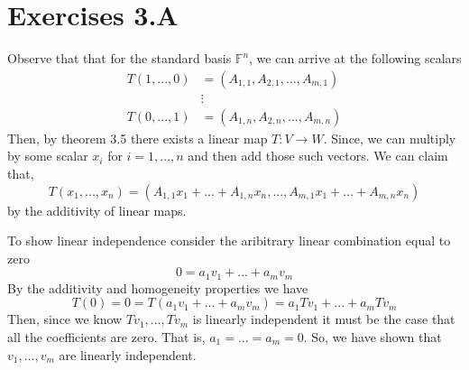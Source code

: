 \documentclass[10pt, twocolumn]{article}
\newcommand{\F}{\mathbb{F}}
\begin{document}
\section{Exercises 3.A}
\begin{q}[3]
	Observe that that for the standard basis $ \F^n $, 
	we can arrive at the following scalars 
	\begin{align*}
		T(1, ..., 0) &= (A_{1, 1}, A_{2, 1}, ..., A_{m, 1}) \\
		& \vdots \\
		T(0, ..., 1) &= (A_{1, n}, A_{2, n}, ..., A_{m, n})
	\end{align*}
	Then, by theorem 3.5 there exists a linear map $ T: V \to W $. 
	Since, we can multiply by some scalar $ x_i $ for $ i = 1, ..., n $ and then add those such vectors. 
	We can claim that, 
	$$ T(x_1, ..., x_n ) =  (A_{1, 1}x_1 + ... + A_{1, n}x_n, ..., A_{m, 1}x_1 + ...+ A_{m, n} x_n) $$
	by the additivity of linear maps. 
\end{q}
\begin{q}[4]
	To show linear independence consider the aribitrary linear combination equal to zero
	$$ 0 = a_1v_1 + ... + a_m v_m $$
	By the additivity and homogeneity properties we have 
	$$ T(0) = 0 = T(a_1v_1 + ... + a_m v_m) = a_1Tv_1 + ... + a_mTv_m $$
	Then, since we know $ Tv_1, ..., Tv_m $ is linearly independent it must be the case that all the coefficients are zero. 
	That is, $ a_1 = ... = a_m = 0 $. 
	So, we have shown that $ v_1, ..., v_m $ are linearly independent. 
\end{q}
\end{document}

